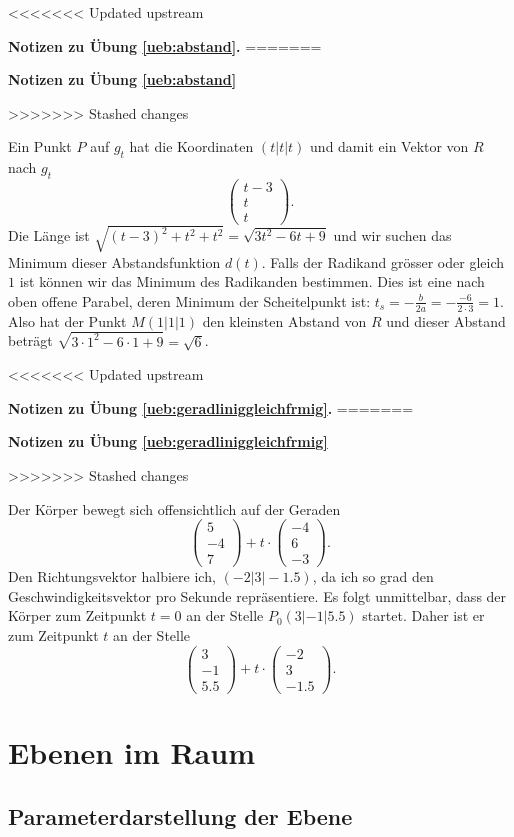 \documentclass[%
11pt,%
twoside,%
titlepage,%
<<<<<<< Updated upstream
german,%
=======
swissgerman,%
>>>>>>> Stashed changes
headsepline%
]{scrartcl}
\newcommand{\faReturnGray}{\textcolor{gray}{\faMailReply}} %
\theoremstyle{definition}
\theoremstyle{plain}
\newcommand{\concatueb}[1]{ueb:#1}%
\newcommand{\concatlsg}[1]{lsg:#1}%
\newenvironment{lsg}[1]{%
<<<<<<< Updated upstream
    \par\noindent\textbf{Notizen zu Übung \ref{\concatueb{#1}}.}%
    \label{\concatlsg{#1}}
=======
    \par\noindent\textbf{Notizen zu Übung \ref{\concatueb{#1}}}\label{\concatlsg{#1}}
    \hfill\hyperref[\concatueb{#1}]{\faReturnGray}\par %
>>>>>>> Stashed changes
}{%
    \par%
}
\begin{document}
\begin{lsg}{abstand}
Ein Punkt $P$ auf $g_t$ hat die Koordinaten $(t|t|t)$ und damit ein Vektor von $R$ nach $g_t$
$$\begin{pmatrix}
    t-3\\t\\t
\end{pmatrix}.
$$
Die Länge ist $\sqrt{(t-3)^2+t^2+t^2}=\sqrt{3t^2-6t+9}$ und wir suchen das Minimum dieser Abstandsfunktion $d(t)$. Falls der Radikand grösser oder gleich $1$ ist können wir das Minimum des Radikanden bestimmen. Dies ist eine nach oben offene Parabel, deren Minimum der Scheitelpunkt ist: $t_s=-\frac{b}{2a}=-\frac{-6}{2\cdot 3}=1$. Also hat der Punkt $M(1|1|1)$ den kleinsten Abstand von $R$ und dieser Abstand beträgt $\sqrt{3\cdot1^2-6\cdot1+9}=\sqrt{6}$.
\end{lsg}
\begin{lsg}{geradliniggleichfrmig}
Der Körper bewegt sich offensichtlich auf der Geraden
$$\begin{pmatrix}
    5\\-4\\7
\end{pmatrix}+t\cdot\begin{pmatrix}
    -4\\6\\-3
\end{pmatrix}.$$
Den Richtungsvektor halbiere ich, $(-2|3|-1.5)$, da ich so grad den Geschwindigkeitsvektor pro Sekunde repräsentiere. Es folgt unmittelbar, dass der Körper zum Zeitpunkt $t=0$ an der Stelle $P_0(3|-1|5.5)$ startet. Daher ist er zum Zeitpunkt $t$ an der Stelle
$$\begin{pmatrix}
    3\\-1\\5.5
\end{pmatrix}+t\cdot\begin{pmatrix}
    -2\\3\\-1.5
\end{pmatrix}.$$
\end{lsg}

\clearpage

\section{Ebenen im Raum}

\subsection{Parameterdarstellung der Ebene}
\end{document}
